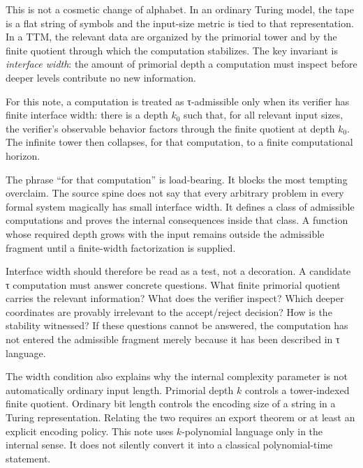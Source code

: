 \documentclass{pantarhei-researchnote}
\begin{document}
This is not a cosmetic change of alphabet. In an ordinary Turing model,
the tape is a flat string of symbols and the input-size metric is tied to
that representation. In a TTM, the relevant data are organized by the
primorial tower and by the finite quotient through which the computation
stabilizes. The key invariant is \emph{interface width}: the amount of
primorial depth a computation must inspect before deeper levels contribute
no new information.

\begin{definition}
For this note, a computation is treated as τ-admissible only when its
verifier has finite interface width: there is a depth \(k_0\) such that,
for all relevant input sizes, the verifier's observable behavior factors
through the finite quotient at depth \(k_0\). The infinite tower then
collapses, for that computation, to a finite computational horizon.
\end{definition}

The phrase ``for that computation'' is load-bearing. It blocks the most
tempting overclaim. The source spine does not say that every arbitrary
problem in every formal system magically has small interface width. It
defines a class of admissible computations and proves the internal
consequences inside that class. A function whose required depth grows with
the input remains outside the admissible fragment until a finite-width
factorization is supplied.

Interface width should therefore be read as a test, not a decoration. A
candidate τ computation must answer concrete questions. What finite
primorial quotient carries the relevant information? What does the
verifier inspect? Which deeper coordinates are provably irrelevant to the
accept/reject decision? How is the stability witnessed? If these
questions cannot be answered, the computation has not entered the
admissible fragment merely because it has been described in τ language.

The width condition also explains why the internal complexity parameter
is not automatically ordinary input length. Primorial depth \(k\)
controls a tower-indexed finite quotient. Ordinary bit length controls
the encoding size of a string in a Turing representation. Relating the
two requires an export theorem or at least an explicit encoding policy.
This note uses \(k\)-polynomial language only in the internal sense. It
does not silently convert it into a classical polynomial-time statement.
\end{document}
